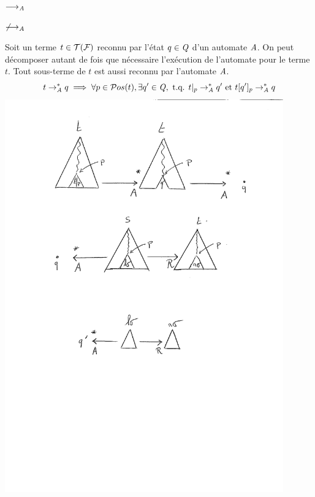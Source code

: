 \begin{example}
  \begin{center}
    $\longrightarrow_\mathit A$
    $\not\longrightarrow_\mathit A$
  \end{center}
\end{example}

\begin{property}
  \label{prop:execution}
  Soit un terme $t \in \mathcal{T(F)} $ reconnu par l'état $q \in \mathit Q$ d'un automate $\mathit A$. 
  On peut décomposer autant de fois que nécessaire l'exécution de l'automate pour le terme $t$.
  Tout sous-terme de $t$ est aussi reconnu par l'automate $\mathit A$.
  \[t \rightarrow_\mathit A^* q \; \Longrightarrow \; \forall p \in \mathcal{ P}os(t), \exists q' \in \mathit Q, \mbox{ t.q. } t|_p \rightarrow_\mathit A^* q' \mbox{ et } t[q']_p \rightarrow_\mathit A^* q\]
  \includegraphics[width=12cm]{2_prerequis/automate_rev}
\end{property}


